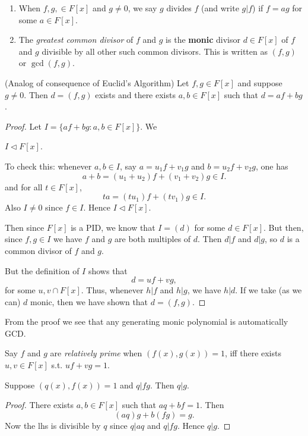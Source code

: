 \begin{definition}[Divisibility]
	\begin{enumerate}
		\item When $f, g, \in F[x]$ and $g \neq 0$, we say $g$ divides $f$ (and write $g | f$) if $f = ag $ for some $a \in F[x]$.
		\item The \textit{greatest common divisor} of $f $ and $g$ is the \textbf{monic} divisor $d \in F[x]$ of $f$ and $g$ divisible by all other such common divisors. This is written as $(f,g)$ or $\operatorname{gcd}(f,g)$.
	\end{enumerate}
\end{definition}
\begin{theorem}(Analog of consequence of Euclid's Algorithm)
	Let $f, g \in F[x]$ and suppose $g \neq 0$. Then $d = (f,g)$ exists and there exists $a, b \in F[x]$ such that $d = a f + b g$.
\end{theorem}
\begin{proof}
	Let $I = \{a f + b g: a, b \in F[x]\} $. We
	\begin{claim}
		$I \triangleleft F[x]$.
	\end{claim}
	To check this: whenever $a, b \in I$, say $a = u_1 f + v_1 g$ and $b = u_2 f + v_2 g$,  one has
	\[
		a + b = (u_1+u_2)f + (v_1+v_2) g \in I
	.\] 
	and for all $t \in F[x]$,
	\[
		ta = (tu_1)f + (tv_1)g \in I
	.\] 
	Also $I \neq 0$ since $f \in I$. Hence $I \triangleleft F[x]$.

	Then since $F[x]$ is a PID, we know that $I = (d)$ for some $d \in F[x]$. But then, since $f, g \in I$ we have $f $ and $g$ are both multiples of $d$. Then $d | f$ and $d | g$, so $d$ is a common divisor of $f$ and $g$.

	But the definition of $I$ shows that 
	\[
		d = u f + v g
	,\]
	for some $u,v \cap F[x]$. Thus, whenever $h | f$ and $h | g$, we have $h | d$. If we take (as we can) $d$ monic, then we have shown that $d = (f,g)$.
\end{proof}

From the proof we see that any generating monic polynomial is automatically GCD.

Say $f$ and $g$ are \textit{relatively prime} when $\left( f(x), g(x) \right)  = 1$, iff there exists  $u, v \in F[x]$ s.t. $uf + vg = 1$.

\begin{lemma}
	Suppose $\left( q(x), f(x) \right) =1$ and $q | fg$. Then $q | g$.
\end{lemma}
\begin{proof}
	There exists $a, b \in F[x]$ such that $a q + b f = 1$. Then 
	\[
		(aq)g + b(fg) = g
	.\] 
	Now the lhs is divisible by $q$ since $q | aq $ and $q | fg $. Hence $q | g$.
\end{proof}

